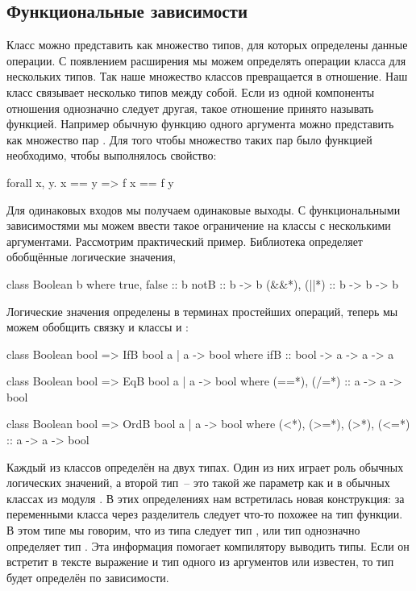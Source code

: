 \subsection{Функциональные зависимости}

Класс можно представить как множество типов, для 
которых определены данные операции. С появлением
расширения  мы можем 
определять операции класса для нескольких типов.
Так наше множество классов превращается в отношение.
Наш класс связывает несколько типов между собой. 
Если из одной компоненты отношения однозначно следует
другая, такое отношение принято называть функцией.
Например обычную функцию одного аргумента 
можно представить как множество пар .
Для того чтобы множество таких пар было функцией
необходимо, чтобы выполнялось свойство:

\begin{code}
forall x, y.  x == y => f x == f y 
\end{code}

Для одинаковых входов мы получаем одинаковые выходы. 
С функциональными зависимостями мы можем ввести
такое ограничение на классы с несколькими аргументами. 
Рассмотрим практический пример. Библиотека 
определяет обобщённые логические значения, 

\begin{code}
class Boolean b where
    true, false :: b
    notB        :: b -> b
    (&&*), (||*) :: b -> b -> b
\end{code}

Логические значения определены в терминах 
простейших операций, теперь мы можем обобщить 
связку  и классы  и :

\begin{code}
class Boolean bool => IfB bool a | a -> bool where
    ifB :: bool -> a -> a -> a

class Boolean bool => EqB bool a | a -> bool where
    (==*), (/=*) :: a -> a -> bool

class Boolean bool => OrdB bool a | a -> bool where
    (<*), (>=*), (>*), (<=*) :: a -> a -> bool
\end{code}

Каждый из классов определён на двух типах. Один
из них играет роль обычных логических значений,
а второй тип~-- это такой же параметр как
и в обычных классах из модуля . 
В этих определениях нам встретилась 
новая конструкция: за переменными класса через
разделитель  следует что-то похожее
на тип функции. В этом типе мы говорим, что из
типа  следует тип , или тип
 однозначно определяет тип .
Эта информация помогает компилятору выводить
типы. Если он встретит в тексте выражение 
 и тип одного из аргументов 
или  известен, то тип  будет определён 
по зависимости. 

